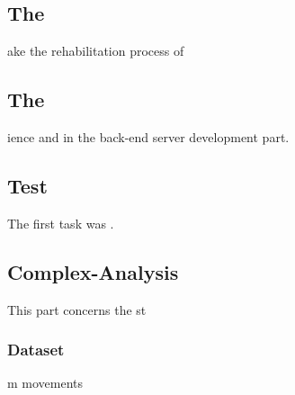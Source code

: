 \documentclass[14pt]{extarticle}
\def\sp{\vspace{5pt}}
\def\ss{\vspace{25pt}}
\begin{document}
	\subsection{The}
	\sp
\begin{flushleft}ake the rehabilitation process of
	\ss
\end{flushleft}


\newpage
\begin{center}
	\section{The}
	\sp
\end{center}
\begin{flushleft}
ience and in the back-end server development part. 
	\ss
\end{flushleft}

\subsection{Test}
\sp
\begin{flushleft}
The first task was .
\end{flushleft}

\subsection{Complex-Analysis} \label{complex}
\sp
\begin{flushleft}
This part concerns the st
\subsubsection{Dataset }
m movements
\end{flushleft}
\end{document}

